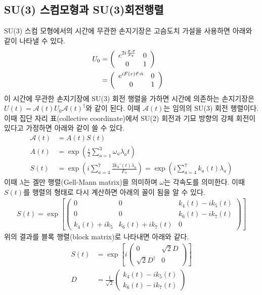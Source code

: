 \documentclass[superscriptaddress,
nofootinbib,byrevtex,fleqn,prd,12pt]{revtex4}
\begin{document}
\subsection{SU(3) 스컴모형과 SU(3)회전행렬}\label{23}

 SU(3) 스컴 모형에서의 시간에 무관한 손지기장은 고슴도치 가설을 사용하면 아래와 같이 나타낼 수 있다.
\begin{align}
U_{0} &= \left(\begin{array} {cc} e^{2i \frac{\vec{\pi} \cdot \vec{ \tau}} {F_{\pi}}} & 0 \\ 0 & 1 \end{array} \right) \cr
&=\left(\begin{array} {cc} e^{i F(r) \vec{\tau}\cdot \hat{n}} & 0 \\ 0 & 1 \end{array} \right)
\end{align}
이 시간에 무관한 손지기장에 SU(3) 회전 행렬을 가하면 시간에 의존하는 손지기장은 $ U(t)= \mathcal{A}(t)U_{0} \mathcal{A}(t)^{\dagger}$와 같이 된다. 이때 $\mathcal{A}(t) $는 임의의 SU(3) 회전 행렬이다. 이때 집단 자리 표(collective coordinate)에서 SU(2) 회전과 기묘 방향의 강체 회전이 있다고 가정하면 아래와 같이 쓸 수 있다.
\begin{align}
  \mathcal{A}(t) &= A(t) S(t) \label{eq:rotation} \\
  A(t) & = \exp \left(\frac{i}{2} \sum_{a=1}^{3} \omega_{a} \lambda_{a} t \right) \\
  S(t) &=  \exp \left( i \sum_{a=4}^{7} \frac{2 k_{a}'(t)\lambda_{a}} {F_{\pi}} \right) = \exp \left( i \sum_{a=4}^{7} k_{a}(t)\lambda_{a} \right)
\end{align}
이때 $ \lambda $는 겔만 행렬(Gell-Mann matrix)을 의미하며 $ \omega$는 각속도를 의미한다. 이때 $ S(t)$를 행렬의 형태로 다시 계산하면 아래의 꼴이 됨을 알 수 있다.
\begin{align}
  S(t)= \exp \left[ \left( \begin{array}{ccc} 0 & 0 & k_{4}(t) -i k_{5}(t) \\
  0 & 0 & k_{6}(t) -i k_{7}(t) \\
  k_{4}(t) + i k_{5} & k_{6}(t) + i k_{7}(t) & 0 \end{array} \right) \right]
\end{align}
위의 결과를 블록 행렬(block matrix)로 나타내면 아래와 같다.
\begin{align}
  S(t)&= \exp \left[i \left( \begin{array}{cc}  0 & \sqrt{2}D \\
  \sqrt{2}D^{\dagger} & 0 \end{array} \right) \right] \\
  D &= \frac{1}{\sqrt{2}} \left( \begin{array}{c} k_{4}(t) - ik_{5}(t)\\
  k_{6}(t) - i k_{7}(t) \end{array} \right)
\end{align}
\end{document}
